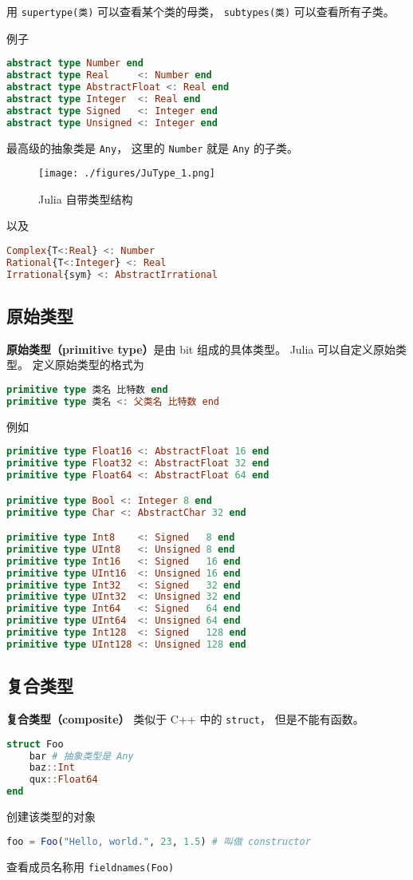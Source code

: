 用 \verb|supertype(类)| 可以查看某个类的母类， \verb|subtypes(类)| 可以查看所有子类。

例子
\begin{lstlisting}[language=julia]
abstract type Number end
abstract type Real     <: Number end
abstract type AbstractFloat <: Real end
abstract type Integer  <: Real end
abstract type Signed   <: Integer end
abstract type Unsigned <: Integer end
\end{lstlisting}
最高级的抽象类是 \verb|Any|， 这里的 \verb|Number| 就是 \verb|Any| 的子类。

\begin{figure}[ht]
\centering
\texttt{[image: ./figures/JuType\_1.png]}
\caption{Julia 自带类型结构} \label{JuType_fig1}
\end{figure}
以及
\begin{lstlisting}[language=julia]
Complex{T<:Real} <: Number
Rational{T<:Integer} <: Real
Irrational{sym} <: AbstractIrrational
\end{lstlisting}


\subsection{原始类型}
\textbf{原始类型（primitive type）}是由 bit 组成的具体类型。 Julia 可以自定义原始类型。 定义原始类型的格式为
\begin{lstlisting}[language=julia]
primitive type 类名 比特数 end
primitive type 类名 <: 父类名 比特数 end
\end{lstlisting}
例如
\begin{lstlisting}[language=julia]
primitive type Float16 <: AbstractFloat 16 end
primitive type Float32 <: AbstractFloat 32 end
primitive type Float64 <: AbstractFloat 64 end

primitive type Bool <: Integer 8 end
primitive type Char <: AbstractChar 32 end

primitive type Int8    <: Signed   8 end
primitive type UInt8   <: Unsigned 8 end
primitive type Int16   <: Signed   16 end
primitive type UInt16  <: Unsigned 16 end
primitive type Int32   <: Signed   32 end
primitive type UInt32  <: Unsigned 32 end
primitive type Int64   <: Signed   64 end
primitive type UInt64  <: Unsigned 64 end
primitive type Int128  <: Signed   128 end
primitive type UInt128 <: Unsigned 128 end
\end{lstlisting}

\subsection{复合类型}
\textbf{复合类型（composite）} 类似于 C++ 中的 \verb|struct|， 但是不能有函数。
\begin{lstlisting}[language=julia]
struct Foo
    bar # 抽象类型是 Any
    baz::Int
    qux::Float64
end
\end{lstlisting}
创建该类型的对象
\begin{lstlisting}[language=julia]
foo = Foo("Hello, world.", 23, 1.5) # 叫做 constructor
\end{lstlisting}
查看成员名称用 \verb|fieldnames(Foo)|

